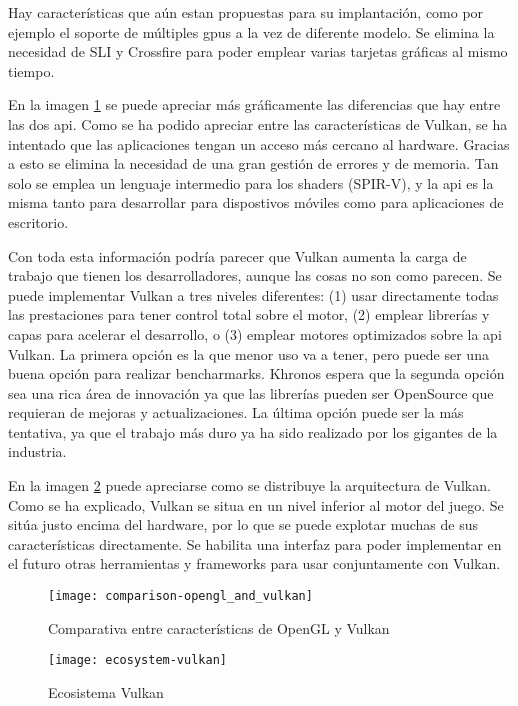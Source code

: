 Hay características que aún estan propuestas para su implantación, como por ejemplo el soporte de múltiples \gls{gpu}s
a la vez de diferente modelo. Se elimina la necesidad de SLI y Crossfire para poder emplear varias tarjetas gráficas al
mismo tiempo.

En la imagen \ref{fig:comparison_opengl_vulkan} se puede apreciar más gráficamente las diferencias que hay entre las
dos \gls{api}. Como se ha podido apreciar entre las características de Vulkan, se ha intentado que las aplicaciones
tengan un acceso más cercano al hardware. Gracias a esto se elimina la necesidad de una gran gestión de errores
y de memoria. Tan solo se emplea un lenguaje intermedio para los shaders (SPIR-V), y la \gls{api} es la misma tanto
para desarrollar para dispostivos móviles como para aplicaciones de escritorio.

Con toda esta información podría parecer que Vulkan aumenta la carga de trabajo que tienen los desarrolladores, aunque
las cosas no son como parecen. Se puede implementar Vulkan a tres niveles diferentes: (1) usar directamente todas las
prestaciones para tener control total sobre el motor, (2) emplear librerías y capas para acelerar el desarrollo, o
(3) emplear motores optimizados sobre la \gls{api} Vulkan. La primera opción es la que menor uso va a tener, pero puede
ser una buena opción para realizar bencharmarks. Khronos espera que la segunda opción sea una rica área de innovación
ya que las librerías pueden ser OpenSource que requieran de mejoras y actualizaciones. La última opción puede ser la
más tentativa, ya que el trabajo más duro ya ha sido realizado por los gigantes de la industria.

En la imagen \ref{fig:vulkan_ecosystem} puede apreciarse como se distribuye la arquitectura de Vulkan. Como se ha
explicado, Vulkan se situa en un nivel inferior al motor del juego. Se sitúa justo encima del hardware, por lo que
se puede explotar muchas de sus características directamente. Se habilita una interfaz para poder implementar en el
futuro otras herramientas y frameworks para usar conjuntamente con Vulkan.

\begin{figure}[t]
	\begin{center}
		\texttt{[image: comparison-opengl\_and\_vulkan]}
		\caption{Comparativa entre características de OpenGL y Vulkan}
		\label{fig:comparison_opengl_vulkan}
	\end{center}
\end{figure}
\begin{figure}[t]
	\begin{center}
		\texttt{[image: ecosystem-vulkan]}
		\caption{Ecosistema Vulkan}
		\label{fig:vulkan_ecosystem}
	\end{center}
\end{figure}
